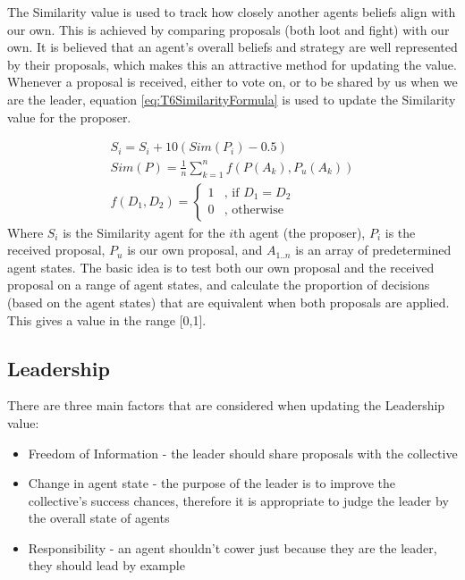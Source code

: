 The Similarity value is used to track how closely another agents beliefs align with our own. This is achieved by comparing proposals (both loot and fight) with our own. It is believed that an agent's overall beliefs and strategy are well represented by their proposals, which makes this an attractive method for updating the value.\\

Whenever a proposal is received, either to vote on, or to be shared by us when we are the leader, equation \ref{eq:T6SimilarityFormula} is used to update the Similarity value for the proposer.

\begin{equation}\label{eq:T6SimilarityFormula}
    \begin{aligned}
    S_{i}=S_{i}+10(Sim(P_{i})-0.5) \\
    Sim(P) = \frac{1}{n}\sum_{k=1}^{n}f(P(A_{k}),P_{u}(A_{k})) \\
    f(D_{1},D_{2})=\left\{
    	\begin{array}{ll}
    		1 & \mbox{, if } D_{1} = D_{2} \\
    		0 & \mbox{, otherwise} 
    	\end{array}\right.
    \end{aligned}
\end{equation}
Where $S_{i}$ is the Similarity agent for the $i$th agent (the proposer), $P_{i}$ is the received proposal, $P_{u}$ is our own proposal, and $A_{1..n}$ is an array of predetermined agent states. The basic idea is to test both our own proposal and the received proposal on a range of agent states, and calculate the proportion of decisions (based on the agent states) that are equivalent when both proposals are applied. This gives a value in the range [0,1].

\subsection{Leadership}

There are three main factors that are considered when updating the Leadership value:

\begin{itemize}
    \item Freedom of Information - the leader should share proposals with the collective
    \item Change in agent state - the purpose of the leader is to improve the collective's success chances, therefore it is appropriate to judge the leader by the overall state of agents
    \item Responsibility - an agent shouldn't cower just because they are the leader, they should lead by example
\end{itemize}


